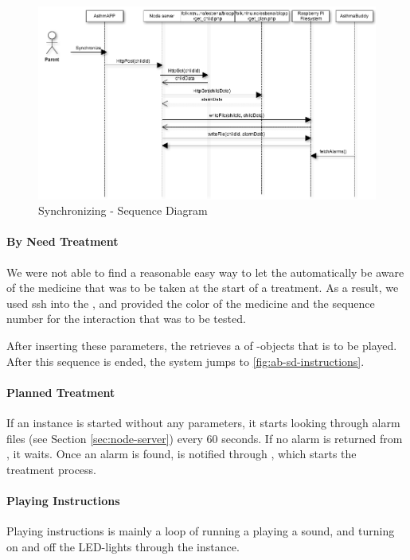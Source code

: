 \begin{figure}
	\centering
		\includegraphics[scale=0.6]{Pictures/sd/sd-synchronizing.png}
	\caption{Synchronizing - Sequence Diagram}
	\label{fig:ab-sd-synchronizing}
\end{figure}

\paragraph{By Need Treatment}
We were not able to find a reasonable easy way to let the \buddy{} automatically be aware of the medicine that was to be taken at the start of a treatment. As a result, we used ssh into the \rpi{}, and provided the color of the medicine and the sequence number for the interaction that was to be tested.

After inserting these parameters, the  retrieves a  of -objects that is to be played. After this sequence is ended, the system jumps to \ref{fig:ab-sd-instructions}.
 
\paragraph{Planned Treatment}
If an  instance is started without any parameters, it starts looking through alarm files (see Section \ref{sec:node-server}) every 60 seconds. If no alarm is returned from , it waits. Once an alarm is found,  is notified through , which starts the treatment process. 
 
\paragraph{Playing Instructions}
Playing instructions is mainly a loop of running a playing a sound, and turning on and off the LED-lights through the  instance. 


